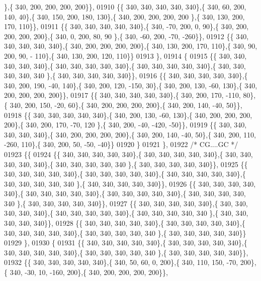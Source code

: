 \begin{DoxyCode}
      \},\{ 340, 200, 200, 200, 200\}\},
01910 \{\{ 340, 340, 340, 340, 340\},\{ 340,  60, 200, 140,  40\},\{ 340, 150, 200, 180, 130\},\{ 340, 200, 200, 200, 200
      \},\{ 340, 130, 200, 170, 110\}\},
01911 \{\{ 340, 340, 340, 340, 340\},\{ 340, -70, 200,   0,  90\},\{ 340, 200, 200, 200, 200\},\{ 340,   0, 200,  80,  90
      \},\{ 340, -60, 200, -70, -260\}\},
01912 \{\{ 340, 340, 340, 340, 340\},\{ 340, 200, 200, 200, 200\},\{ 340, 130, 200, 170, 110\},\{ 340,  90, 200,  90, -
      110\},\{ 340, 130, 200, 120, 110\}\}
01913 \},
01914 \{
01915 \{\{ 340, 340, 340, 340, 340\},\{ 340, 340, 340, 340, 340\},\{ 340, 340, 340, 340, 340\},\{ 340, 340, 340, 340, 340
      \},\{ 340, 340, 340, 340, 340\}\},
01916 \{\{ 340, 340, 340, 340, 340\},\{ 340, 200, 190, -40, 140\},\{ 340, 200, 120, -150,  30\},\{ 340, 200, 130, -60, 
      130\},\{ 340, 200, 200, 200, 200\}\},
01917 \{\{ 340, 340, 340, 340, 340\},\{ 340, 200, 170, -110,  80\},\{ 340, 200, 150, -20,  60\},\{ 340, 200, 200, 200, 
      200\},\{ 340, 200, 140, -40,  50\}\},
01918 \{\{ 340, 340, 340, 340, 340\},\{ 340, 200, 130, -60, 130\},\{ 340, 200, 200, 200, 200\},\{ 340, 200, 170, -70, 120
      \},\{ 340, 200, -40, -420, -50\}\},
01919 \{\{ 340, 340, 340, 340, 340\},\{ 340, 200, 200, 200, 200\},\{ 340, 200, 140, -40,  50\},\{ 340, 200, 110, -260, 
      110\},\{ 340, 200,  50, -50, -40\}\}
01920 \}
01921 \},
01922 \textcolor{comment}{/* CG....GC */}
01923 \{\{
01924 \{\{ 340, 340, 340, 340, 340\},\{ 340, 340, 340, 340, 340\},\{ 340, 340, 340, 340, 340\},\{ 340, 340, 340, 340, 340
      \},\{ 340, 340, 340, 340, 340\}\},
01925 \{\{ 340, 340, 340, 340, 340\},\{ 340, 340, 340, 340, 340\},\{ 340, 340, 340, 340, 340\},\{ 340, 340, 340, 340, 340
      \},\{ 340, 340, 340, 340, 340\}\},
01926 \{\{ 340, 340, 340, 340, 340\},\{ 340, 340, 340, 340, 340\},\{ 340, 340, 340, 340, 340\},\{ 340, 340, 340, 340, 340
      \},\{ 340, 340, 340, 340, 340\}\},
01927 \{\{ 340, 340, 340, 340, 340\},\{ 340, 340, 340, 340, 340\},\{ 340, 340, 340, 340, 340\},\{ 340, 340, 340, 340, 340
      \},\{ 340, 340, 340, 340, 340\}\},
01928 \{\{ 340, 340, 340, 340, 340\},\{ 340, 340, 340, 340, 340\},\{ 340, 340, 340, 340, 340\},\{ 340, 340, 340, 340, 340
      \},\{ 340, 340, 340, 340, 340\}\}
01929 \},
01930 \{
01931 \{\{ 340, 340, 340, 340, 340\},\{ 340, 340, 340, 340, 340\},\{ 340, 340, 340, 340, 340\},\{ 340, 340, 340, 340, 340
      \},\{ 340, 340, 340, 340, 340\}\},
01932 \{\{ 340, 340, 340, 340, 340\},\{ 340,  50,  60,   0, 200\},\{ 340, 110, 150, -70, 200\},\{ 340, -30,  10, -160, 
      200\},\{ 340, 200, 200, 200, 200\}\},

\end{DoxyCode}
